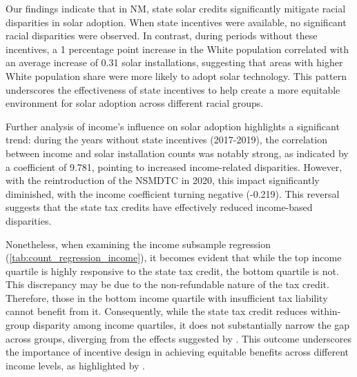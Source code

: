\documentclass[12pt,twoside,letterpaper]{article}
\begin{document}
Our findings indicate that in NM, state solar credits significantly mitigate racial disparities in solar adoption. When state incentives were available, no significant racial disparities were observed. In contrast, during periods without these incentives, a 1 percentage point increase in the White population correlated with an average increase of 0.31 solar installations, suggesting that areas with higher White population share were more likely to adopt solar technology. This pattern underscores the effectiveness of state incentives to help create a more equitable environment for solar adoption across different racial groups. 

Further analysis of income’s influence on solar adoption highlights a significant trend: during the years without state incentives (2017-2019), the correlation between income and solar installation counts was notably strong, as indicated by a coefficient of 9.781, pointing to increased income-related disparities. However, with the reintroduction of the NSMDTC in 2020, this impact significantly diminished, with the income coefficient turning negative (-0.219). This reversal suggests that the state tax credits have effectively reduced income-based disparities. 

Nonetheless, when examining the income subsample regression (\autoref{tab:count_regression_income}), it becomes evident that while the top income quartile is highly responsive to the state tax credit, the bottom quartile is not. This discrepancy may be due to the non-refundable nature of the tax credit. Therefore, those in the bottom income quartile with insufficient tax liability cannot benefit from it. Consequently, while the state tax credit reduces within-group disparity among income quartiles, it does not substantially narrow the gap across groups, diverging from the effects suggested by \textcite{oshaughnessy_rooftop_2022}. This outcome underscores the importance of incentive design in achieving equitable benefits across different income levels, as highlighted by \textcite{borenstein_distributional_2016}.

\end{document}
